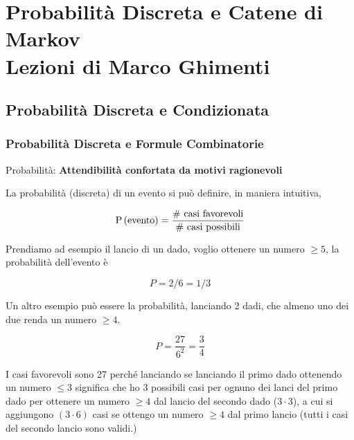 \part{Probabilità Discreta e Catene di Markov\\Lezioni di Marco Ghimenti}


\chapter{Probabilit\`a Discreta e Condizionata}

\section{Probabilit\`a Discreta e Formule Combinatorie}

\begin{defn}
    Probabilit\`a: \textbf{Attendibilit\`a confortata da motivi ragionevoli}
\end{defn}
    La probabilit\`a (discreta) di un evento si pu\`o definire, in maniera intuitiva,
\begin{defn}
        \begin{equation}
            \text{P}\left(\text{evento}\right) = \dfrac{\text{\# casi favorevoli}}{\text{\# casi possibili}}
        \end{equation}

\end{defn}

\begin{exmp}
    Prendiamo ad esempio il lancio di un dado, voglio ottenere un numero $ \geq 5 $, la probabilit\`a dell'evento \`e

    \begin{equation*}
        P = 2/6 = 1/3
    \end{equation*}
    
    Un altro esempio pu\`o essere la probabilit\`a, lanciando 2 dadi, che almeno uno dei due renda un numero  $ \geq 4 $.
    
    \begin{equation*}
        P = \dfrac{27}{6^2} = \dfrac{3}{4}
    \end{equation*}
    
    I casi favorevoli sono 27 perch\'e lanciando se lanciando il primo dado ottenendo un numero $ \leq 3 $ significa che ho 3 possibili casi per ognuno dei lanci del primo dado per ottenere un numero $ \geq 4 $ dal lancio del secondo dado ($ 3 \cdot 3 $), a cui si aggiungono $ (3 \cdot 6) $ casi se ottengo un numero $ \geq 4 $ dal primo lancio (tutti i casi del secondo lancio sono validi.)
\end{exmp}


